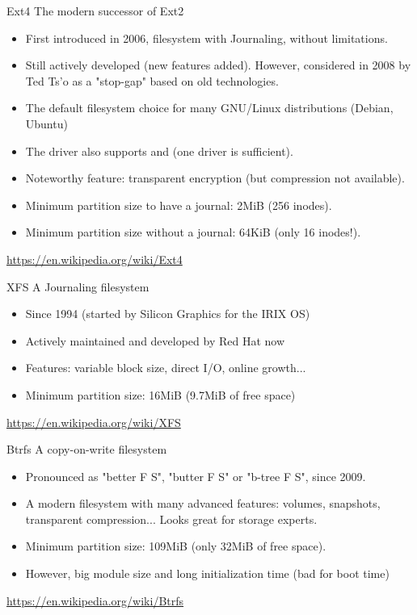 \begin{frame}{Ext4}
    The modern successor of Ext2
    \begin{itemize}
        \item First introduced in 2006, filesystem with Journaling, without  limitations.
        \item Still actively developed (new features added). However, considered in 2008
              by Ted Ts'o as a "stop-gap" based on old technologies.
        \item The default filesystem choice for many GNU/Linux distributions (Debian, Ubuntu)
        \item The  driver also supports  and  (one driver is sufficient).
        \item Noteworthy feature: transparent encryption (but compression not available).
	\item Minimum partition size to have a journal: 2MiB (256 inodes).
        \item Minimum partition size without a journal: 64KiB (only 16 inodes!).
    \end{itemize}
    \url{https://en.wikipedia.org/wiki/Ext4}
\end{frame}

\begin{frame}{XFS}
    A Journaling filesystem
    \begin{itemize}
        \item Since 1994 (started by Silicon Graphics for the IRIX OS)
        \item Actively maintained and developed by Red Hat now
        \item Features: variable block size, direct I/O, online growth...
        \item Minimum partition size: 16MiB (9.7MiB of free space)
    \end{itemize}
    \url{https://en.wikipedia.org/wiki/XFS}
\end{frame}

\begin{frame}{Btrfs}
    A copy-on-write filesystem
    \begin{itemize}
        \item Pronounced as "better F S", "butter F S" or "b-tree F S", since 2009.
        \item A modern filesystem with many advanced features: volumes, snapshots, transparent compression...
			  Looks great for storage experts.
        \item Minimum partition size: 109MiB (only 32MiB of free space).
        \item However, big module size and long initialization time (bad for boot time)
    \end{itemize}
    \url{https://en.wikipedia.org/wiki/Btrfs}
\end{frame}

